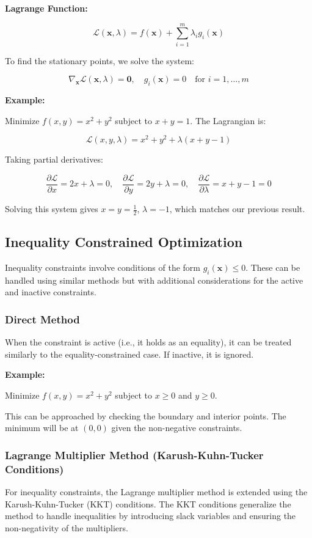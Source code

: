\documentclass[]{article}
\begin{document}
	\textbf{Lagrange Function:}
	
	\[
	\mathcal{L}(\mathbf{x}, \lambda) = f(\mathbf{x}) + \sum_{i=1}^m \lambda_i g_i(\mathbf{x})
	\]
	
	To find the stationary points, we solve the system:
	
	\[
	\nabla_\mathbf{x} \mathcal{L}(\mathbf{x}, \lambda) = \mathbf{0}, \quad g_i(\mathbf{x}) = 0 \quad \text{for } i = 1, \dots, m
	\]
	
	\textbf{Example:}
	
	Minimize \( f(x, y) = x^2 + y^2 \) subject to \( x + y = 1 \). The Lagrangian is:
	
	\[
	\mathcal{L}(x, y, \lambda) = x^2 + y^2 + \lambda (x + y - 1)
	\]
	
	Taking partial derivatives:
	
	\[
	\frac{\partial \mathcal{L}}{\partial x} = 2x + \lambda = 0, \quad \frac{\partial \mathcal{L}}{\partial y} = 2y + \lambda = 0, \quad \frac{\partial \mathcal{L}}{\partial \lambda} = x + y - 1 = 0
	\]
	
	Solving this system gives \( x = y = \frac{1}{2} \), \( \lambda = -1 \), which matches our previous result.
	
	\subsection{Inequality Constrained Optimization}
	Inequality constraints involve conditions of the form \( g_i(\mathbf{x}) \leq 0 \). These can be handled using similar methods but with additional considerations for the active and inactive constraints.
	
	\subsubsection{Direct Method}
	When the constraint is active (i.e., it holds as an equality), it can be treated similarly to the equality-constrained case. If inactive, it is ignored.
	
	\textbf{Example:}
	
	Minimize \( f(x, y) = x^2 + y^2 \) subject to \( x \geq 0 \) and \( y \geq 0 \).
	
	This can be approached by checking the boundary and interior points. The minimum will be at \( (0,0) \) given the non-negative constraints.
	
	\subsubsection{Lagrange Multiplier Method (Karush-Kuhn-Tucker Conditions)}
	For inequality constraints, the Lagrange multiplier method is extended using the Karush-Kuhn-Tucker (KKT) conditions. The KKT conditions generalize the method to handle inequalities by introducing slack variables and ensuring the non-negativity of the multipliers.
	
\end{document}
